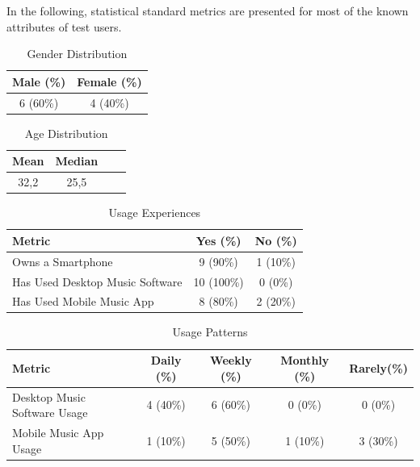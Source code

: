 In the following, statistical standard metrics are presented for most of the known attributes of test users.

\begin{table}[H]
\begin{center}
\begin{tabular}{ | c | c | }
	\hline
	\textbf{Male (\%)} & \textbf{Female (\%)} \\ \hline
	6 (60\%) & 4 (40\%) \\ \hline
\end{tabular}
\caption {Gender Distribution} \label{tab:gender} 
\end{center}
\end{table}

\begin{table}[H]
\begin{center}
\begin{tabular}{ | c | c | c | c | }
	\hline
	\textbf{Mean} & \textbf{Median}\\ \hline
	32,2 & 25,5 \\ \hline
\end{tabular}
\caption {Age Distribution} \label{tab:age-distribution} 
\end{center}
\end{table}

\begin{table}[H]
\begin{center}
\begin{tabular}{ | l | c | c | }
	\hline
	\textbf{Metric} & \textbf{Yes (\%)} & \textbf{No (\%)} \\ \hline
	Owns a Smartphone & 9 (90\%) & 1 (10\%) \\ \hline
	Has Used Desktop Music Software & 10 (100\%) & 0 (0\%) \\ \hline
	Has Used Mobile Music App & 8 (80\%) & 2 (20\%) \\ \hline
\end{tabular}
\caption {Usage Experiences} \label{tab:usage-experiences} 
\end{center}
\end{table}

\begin{table}[H]
\begin{center}
\begin{tabular}{ | l | c | c | c | c |}
	\hline
	\textbf{Metric} & \textbf{Daily (\%)} & \textbf{Weekly (\%)} & \textbf{Monthly (\%)} & \textbf{Rarely(\%)}\\ \hline
	Desktop Music Software Usage & 4 (40\%) & 6 (60\%) & 0 (0\%) & 0 (0\%) \\ \hline
	Mobile Music App Usage & 1 (10\%) & 5 (50\%) & 1 (10\%) & 3 (30\%) \\ \hline
\end{tabular}
\caption {Usage Patterns} \label{tab:usage-patterns} 
\end{center}
\end{table}

